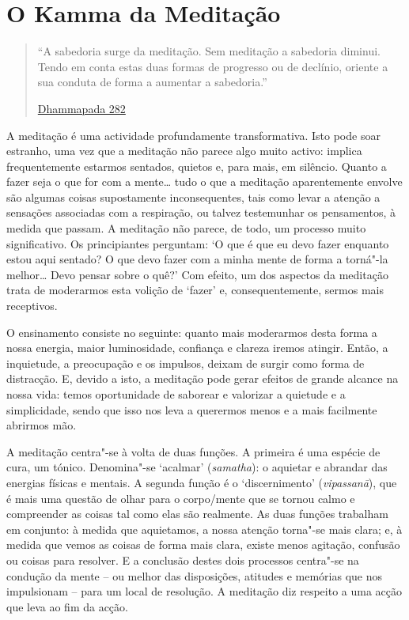 
\chapter{O Kamma da Meditação}


\begin{quote}

``A sabedoria surge da meditação. Sem meditação a sabedoria diminui.
Tendo em conta estas duas formas de progresso ou de declínio, oriente a sua conduta
de forma a aumentar a sabedoria.''

\href{https://suttacentral.net/dhp273"-289/en/buddharakkhita}{Dhammapada 282}

\end{quote}

A meditação é uma actividade profundamente transformativa. Isto pode soar
estranho, uma vez que a meditação não parece algo muito activo: implica
frequentemente estarmos sentados, quietos e, para mais, em silêncio. Quanto a
fazer seja o que for com a mente\ldots{} tudo o que a meditação aparentemente
envolve são algumas coisas supostamente inconsequentes, tais como levar a
atenção a sensações associadas com a respiração, ou talvez testemunhar os
pensamentos, à medida que passam. A meditação não parece, de todo, um processo
muito significativo. Os principiantes perguntam: `O que é que eu devo fazer
enquanto estou aqui sentado? O que devo fazer com a minha mente de forma a
torná"-la melhor\ldots{} Devo pensar sobre o quê?' Com efeito, um dos aspectos da
meditação trata de moderarmos esta volição de `fazer' e, consequentemente,
sermos mais receptivos.

O ensinamento consiste no seguinte: quanto mais moderarmos desta forma a nossa
energia, maior luminosidade, confiança e clareza iremos atingir. Então, a
inquietude, a preocupação e os impulsos, deixam de surgir como forma de
distracção. E, devido a isto, a meditação pode gerar efeitos de grande alcance
na nossa vida: temos oportunidade de saborear e valorizar a quietude e a
simplicidade, sendo que isso nos leva a querermos menos e a mais facilmente
abrirmos mão.

A meditação centra"-se à volta de duas funções. A primeira é uma espécie de cura,
um tónico. Denomina"-se `acalmar' (\emph{samatha}): o aquietar e abrandar das
energias físicas e mentais. A segunda função é o `discernimento'
(\emph{vipassanā}), que é mais uma questão de olhar para o corpo/mente que se
tornou calmo e compreender as coisas tal como elas são realmente. As duas
funções trabalham em conjunto: à medida que aquietamos, a nossa atenção torna"-se
mais clara; e, à medida que vemos as coisas de forma mais clara, existe menos
agitação, confusão ou coisas para resolver. E a conclusão destes dois processos
centra"-se na condução da mente -- ou melhor das disposições, atitudes e memórias
que nos impulsionam -- para um local de resolução. A meditação diz respeito a
uma acção que leva ao fim da acção.

